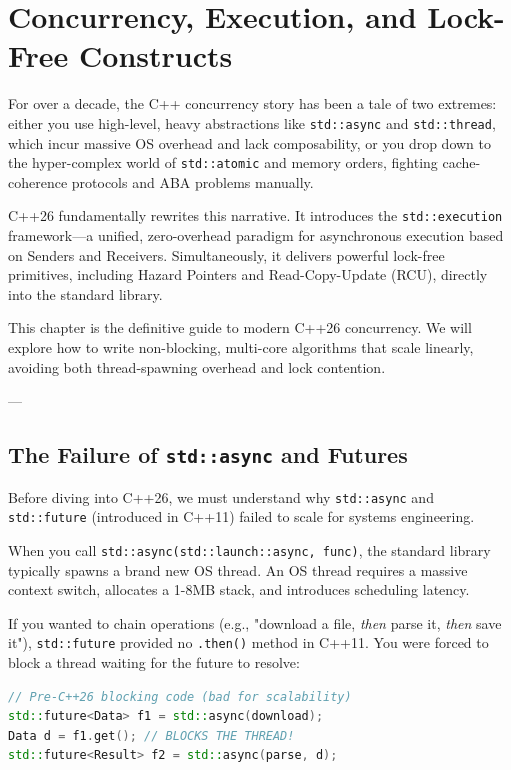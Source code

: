 \chapter{Concurrency, Execution, and Lock-Free Constructs}

For over a decade, the C++ concurrency story has been a tale of two extremes: either you use high-level, heavy abstractions like \texttt{std::async} and \texttt{std::thread}, which incur massive OS overhead and lack composability, or you drop down to the hyper-complex world of \texttt{std::atomic} and memory orders, fighting cache-coherence protocols and ABA problems manually.

C++26 fundamentally rewrites this narrative. It introduces the \texttt{std::execution} framework—a unified, zero-overhead paradigm for asynchronous execution based on Senders and Receivers. Simultaneously, it delivers powerful lock-free primitives, including Hazard Pointers and Read-Copy-Update (RCU), directly into the standard library.

This chapter is the definitive guide to modern C++26 concurrency. We will explore how to write non-blocking, multi-core algorithms that scale linearly, avoiding both thread-spawning overhead and lock contention.

---

\section{The Failure of \texttt{std::async} and Futures}

Before diving into C++26, we must understand why \texttt{std::async} and \texttt{std::future} (introduced in C++11) failed to scale for systems engineering.

When you call \texttt{std::async(std::launch::async, func)}, the standard library typically spawns a brand new OS thread. An OS thread requires a massive context switch, allocates a 1-8MB stack, and introduces scheduling latency. 

If you wanted to chain operations (e.g., "download a file, \textit{then} parse it, \textit{then} save it"), \texttt{std::future} provided no \texttt{.then()} method in C++11. You were forced to block a thread waiting for the future to resolve:

\begin{lstlisting}[language=C++]
// Pre-C++26 blocking code (bad for scalability)
std::future<Data> f1 = std::async(download);
Data d = f1.get(); // BLOCKS THE THREAD!
std::future<Result> f2 = std::async(parse, d);
\end{lstlisting}

